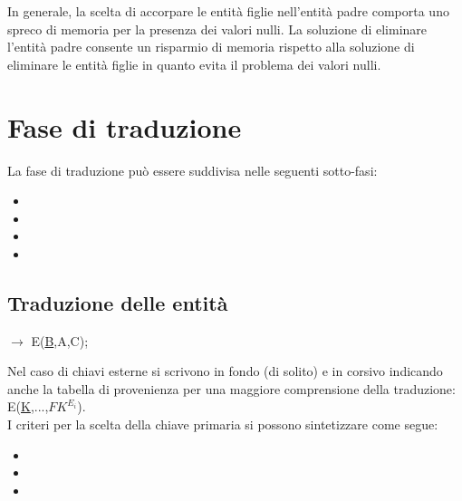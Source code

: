 \documentclass[12pt, a4paper]{report}
\begin{document}
    In generale, la scelta di accorpare le entità figlie nell'entità padre comporta uno spreco di memoria per la presenza dei valori nulli. La soluzione di eliminare l'entità padre consente un risparmio di memoria rispetto alla soluzione di eliminare le entità figlie in quanto evita il problema dei valori nulli.
    \section{Fase di traduzione}
    La fase di traduzione può essere suddivisa nelle seguenti sotto-fasi:
    \begin{itemize}
        \item {}
        \item {}
        \item {}
        \item {}
    \end{itemize}
    \subsection{Traduzione delle entità}
    \begin{center}
        $\rightarrow$
        E(\underline{B},A,C);
    \end{center}
    Nel caso di chiavi esterne si scrivono in fondo (di solito) e in corsivo indicando anche la tabella di provenienza per una maggiore comprensione della traduzione: E(\underline{K},...,\textit{$FK^{E_{i}}$}).\\
    I criteri per la scelta della chiave primaria si possono sintetizzare come segue:
    \begin{itemize}
        \item {}
        \item {}
        \item {}
    \end{itemize}
\end{document}
